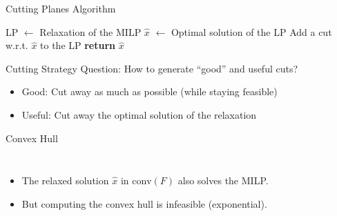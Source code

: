 \begin{frame}{Cutting Planes Algorithm}
     \begin{algorithmic}[1]
     \State LP $\gets$ Relaxation of the MILP
     \Repeat
    	\State $\hat{x}$ $\gets$ Optimal solution of the LP 
    		\State Add a cut w.r.t. $\hat{x}$ to the LP
    	\EndIf 
    \State \textbf{return} $\hat{x}$
   \end{algorithmic}
\end{frame}

\begin{frame}[c]{Cutting Strategy}
\centering\large
	Question: How to generate ``good'' and useful cuts?
	\begin{itemize}[<+(1)->]
	\item Good: Cut away as much as possible (while staying feasible)
	\item Useful: Cut away the optimal solution of the relaxation
	\end{itemize}
\end{frame}

\begin{frame}{Convex Hull}
\begin{columns}
\begin{itemize}
\item The relaxed solution $\hat{x}$ in $\text{conv}(F)$ also solves the MILP.
\item But computing the convex hull is infeasible (exponential). %
\end{itemize}

\begin{figure}[p]
        \centering
        
    \end{figure}
\end{columns}
\end{frame}

